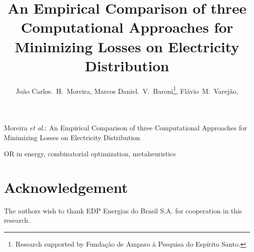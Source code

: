 \documentclass[peerreview]{IEEEtran}
\begin{document}
\title{An Empirical Comparison of three Computational Approaches for Minimizing Losses on Electricity Distribution}

\author{Jo\~ao Carlos.~H.~Moreira,
	Marcos Daniel.~V.~Baroni\thanks{Research supported by Funda\c c\~ao de Amparo \`a Pesquisa do Esp\'irito Santo.},
	Fl\'avio~M.~Varej\~ao,
}

%
{Moreira \MakeLowercase{\textit{et al.}}: An Empirical Comparison of three Computational Approaches for Minimizing Losses on Electricity Distribution}

\maketitle

\begin{abstract}

\end{abstract}

\begin{IEEEkeywords}
OR in energy, combinatorial optimization, metaheuristics
\end{IEEEkeywords}

\IEEEpeerreviewmaketitle









\section*{Acknowledgement}
The authors wish to thank EDP Energias do Brasil S.A. for cooperation in this research.

\ifCLASSOPTIONcaptionsoff
  \newpage
\fi





\flushend
\end{document}
